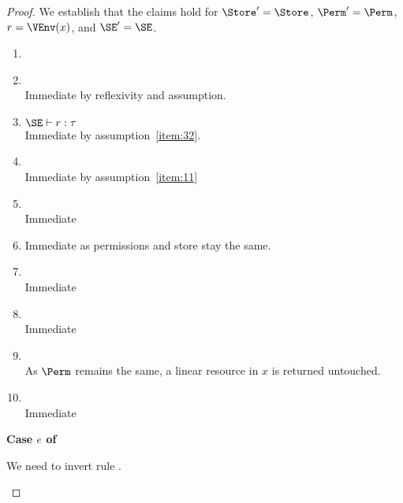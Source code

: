 \begin{proof}
  We establish that the claims hold for
  $\Store' = \Store$, $\Perm' = \Perm$, $r = \VEnv (x)$, and $\SE' = \SE$.
  \begin{enumerate}[({R}1)]
  \item \resultOk{}{}
  \item \resultEnv{}{}
    \\ Immediate by reflexivity and assumption.
  \item $\SE \vdash r : \tau$
    \\ Immediate by assumption~\ref{item:32}.
  \item \resultPermDom{}{}
    \\ Immediate by assumption~\ref{item:11}
  \item \resultReachPerm{}{}
    \\ Immediate
  \item \resultFrame{}{}{}
    Immediate as permissions and store stay the same.
  \item \resultImmutables{}{}{}
    \\ Immediate
  \item \resultMutables{}{}{}
    \\Immediate
  \item \resultResources{}{}{}
    \\ As $\Perm$ remains the same, a linear resource in $x$ is
    returned untouched.
  \item \resultThinAir{}{}
    \\ Immediate
  \end{enumerate}

  \newpage
  \textbf{Case $e$ of}

  We need to invert rule .
  \begin{mathpar}
  \end{mathpar}


\end{proof}
